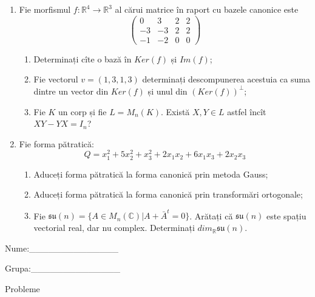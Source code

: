 \documentclass{article}
\begin{document}
\begin{enumerate}
 \item Fie morfismul $f:\mathbb{R}^4 \to \mathbb{R}^3$ al cărui matrice în raport cu bazele canonice este
$$\begin{pmatrix}
0&3&2&2\\
-3&-3&2&2\\
-1&-2&0&0
\end{pmatrix}$$

\begin{enumerate}
\item Determinați cîte o bază în $Ker(f)$ și $Im(f)$;
\item Fie vectorul $v=(1,3,1,3)$ determinați descompunerea acestuia ca suma dintre un vector din $Ker(f)$ și unul din $(Ker(f))^\perp$;
\item Fie $K$ un corp și fie $L=M_n(K)$. Există $X,Y \in L$ astfel încît $XY-YX=I_n$?  
\end{enumerate}
\item Fie forma pătratică:
$$Q= x_1^2+5x_2^2+x_3^2+2x_1x_2+6x_1x_3+2x_2x_3$$

\begin{enumerate}
\item Aduceți forma pătratică la forma canonică prin metoda Gauss;
\item Aduceți forma pătratică la forma canonică prin transformări ortogonale;
\item Fie $\mathfrak{su}(n)=\{ A \in M_n(\mathbb{C}) | A+\bar{A}^t=0\}$. Arătați că $\mathfrak{su}(n)$ este spațiu vectorial real, dar nu complex.
Determinați $dim_{\mathbb{R}}\mathfrak{su}(n)$.
\end{enumerate}
\end{enumerate}
\newpage
\begin{flushright}
Nume:\_\_\_\_\_\_\_\_\_\_\_\_\_\_
 
 
Grupa:\_\_\_\_\_\_\_\_\_\_\_\_\_\_
\end{flushright}
\begin{center}
\vspace{2cm}
{\Large Probleme}
\vspace{2cm}
\end{center}
\end{document}
